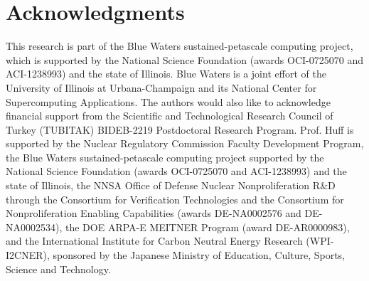 \section{Acknowledgments}
This research is part of the Blue Waters sustained-petascale computing project,
which is supported by the National Science Foundation (awards OCI-0725070 and
ACI-1238993) and the state of Illinois. Blue Waters is a joint effort of the
University of Illinois at Urbana-Champaign and its National Center for
Supercomputing Applications. 
The authors would also like to acknowledge financial support from the Scientific
and Technological Research Council of Turkey (TUBITAK) BIDEB-2219 Postdoctoral
Research Program. 
Prof. Huff is supported by the Nuclear Regulatory Commission Faculty Development
Program, the Blue Waters sustained-petascale computing project supported by the
National Science Foundation (awards OCI-0725070 and ACI-1238993) and the state
of Illinois, the NNSA Office of Defense Nuclear Nonproliferation R$\&$D through
the Consortium for Verification Technologies and the Consortium for
Nonproliferation Enabling Capabilities (awards DE-NA0002576 and DE-NA0002534),
the DOE ARPA-E MEITNER Program (award DE-AR0000983), and the International
Institute for Carbon Neutral Energy Research (WPI-I2CNER), sponsored by the
Japanese Ministry of Education, Culture, Sports, Science and Technology.
